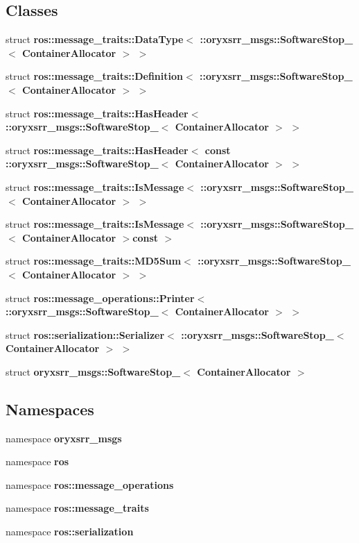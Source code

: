 \subsection*{\-Classes}
\begin{DoxyCompactItemize}
\item 
struct {\bf ros\-::message\-\_\-traits\-::\-Data\-Type$<$ \-::oryxsrr\-\_\-msgs\-::\-Software\-Stop\-\_\-$<$ Container\-Allocator $>$ $>$}
\item 
struct {\bf ros\-::message\-\_\-traits\-::\-Definition$<$ \-::oryxsrr\-\_\-msgs\-::\-Software\-Stop\-\_\-$<$ Container\-Allocator $>$ $>$}
\item 
struct {\bf ros\-::message\-\_\-traits\-::\-Has\-Header$<$ \-::oryxsrr\-\_\-msgs\-::\-Software\-Stop\-\_\-$<$ Container\-Allocator $>$ $>$}
\item 
struct {\bf ros\-::message\-\_\-traits\-::\-Has\-Header$<$ const \-::oryxsrr\-\_\-msgs\-::\-Software\-Stop\-\_\-$<$ Container\-Allocator $>$ $>$}
\item 
struct {\bf ros\-::message\-\_\-traits\-::\-Is\-Message$<$ \-::oryxsrr\-\_\-msgs\-::\-Software\-Stop\-\_\-$<$ Container\-Allocator $>$ $>$}
\item 
struct {\bf ros\-::message\-\_\-traits\-::\-Is\-Message$<$ \-::oryxsrr\-\_\-msgs\-::\-Software\-Stop\-\_\-$<$ Container\-Allocator $>$const  $>$}
\item 
struct {\bf ros\-::message\-\_\-traits\-::\-M\-D5\-Sum$<$ \-::oryxsrr\-\_\-msgs\-::\-Software\-Stop\-\_\-$<$ Container\-Allocator $>$ $>$}
\item 
struct {\bf ros\-::message\-\_\-operations\-::\-Printer$<$ \-::oryxsrr\-\_\-msgs\-::\-Software\-Stop\-\_\-$<$ Container\-Allocator $>$ $>$}
\item 
struct {\bf ros\-::serialization\-::\-Serializer$<$ \-::oryxsrr\-\_\-msgs\-::\-Software\-Stop\-\_\-$<$ Container\-Allocator $>$ $>$}
\item 
struct {\bf oryxsrr\-\_\-msgs\-::\-Software\-Stop\-\_\-$<$ Container\-Allocator $>$}
\end{DoxyCompactItemize}
\subsection*{\-Namespaces}
\begin{DoxyCompactItemize}
\item 
namespace {\bf oryxsrr\-\_\-msgs}
\item 
namespace {\bf ros}
\item 
namespace {\bf ros\-::message\-\_\-operations}
\item 
namespace {\bf ros\-::message\-\_\-traits}
\item 
namespace {\bf ros\-::serialization}
\end{DoxyCompactItemize}
